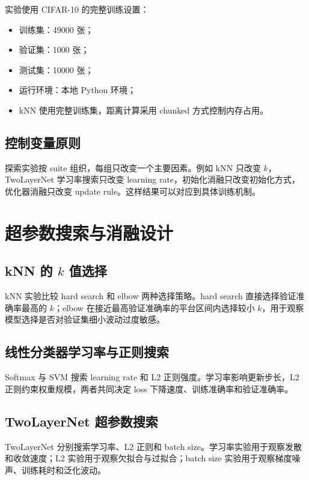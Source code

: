 \documentclass[UTF8]{ctexart}
\begin{document}
实验使用 CIFAR-10 的完整训练设置：
\begin{itemize}
  \item 训练集：49000 张；
  \item 验证集：1000 张；
  \item 测试集：10000 张；
  \item 运行环境：本地 Python 环境；
  \item kNN 使用完整训练集，距离计算采用 chunked 方式控制内存占用。
\end{itemize}

\subsection{控制变量原则}

探索实验按 suite 组织，每组只改变一个主要因素。例如 kNN 只改变 $k$，TwoLayerNet 学习率搜索只改变 learning rate，初始化消融只改变初始化方式，优化器消融只改变 update rule。这样结果可以对应到具体训练机制。

\section{超参数搜索与消融设计}

\subsection{kNN 的 $k$ 值选择}

kNN 实验比较 hard search 和 elbow 两种选择策略。hard search 直接选择验证准确率最高的 $k$；elbow 在接近最高验证准确率的平台区间内选择较小 $k$，用于观察模型选择是否对验证集细小波动过度敏感。

\subsection{线性分类器学习率与正则搜索}

Softmax 与 SVM 搜索 learning rate 和 L2 正则强度。学习率影响更新步长，L2 正则约束权重规模，两者共同决定 loss 下降速度、训练准确率和验证准确率。

\subsection{TwoLayerNet 超参数搜索}

TwoLayerNet 分别搜索学习率、L2 正则和 batch size。学习率实验用于观察发散和收敛速度；L2 实验用于观察欠拟合与过拟合；batch size 实验用于观察梯度噪声、训练耗时和泛化波动。
\end{document}
